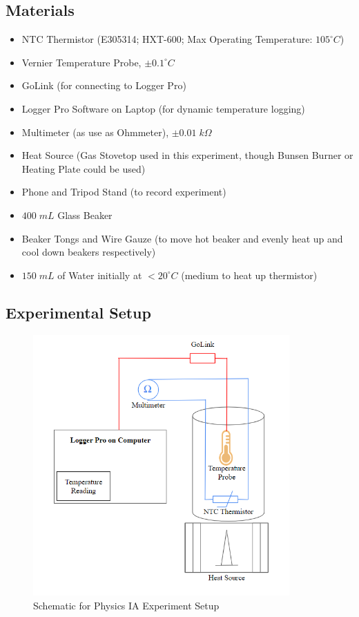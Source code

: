 \subsection{Materials}
\begin{itemize}[noitemsep]
    \item NTC Thermistor (E305314; HXT-600; Max Operating Temperature: $105^\circ C$)
    \item Vernier Temperature Probe, $\pm 0.1^\circ C$
    \item GoLink (for connecting to Logger Pro)
    \item Logger Pro Software on Laptop (for dynamic temperature logging)
    \item Multimeter (as use as Ohmmeter), $\pm 0.01 \; k\Omega$ 
    \item Heat Source (Gas Stovetop used in this experiment, though Bunsen Burner or Heating Plate could be used)
    \item Phone and Tripod Stand (to record experiment)
    \item $400 \; mL$ Glass Beaker
    \item Beaker Tongs and Wire Gauze (to move hot beaker and evenly heat up and cool down beakers respectively)
    \item $150 \; mL$ of Water initially at $<20^\circ C$ (medium to heat up thermistor)
\end{itemize}

\subsection{Experimental Setup}
\begin{figure}[ht]
    \centering
    \includegraphics[width=\textwidth,height=100mm,keepaspectratio]{images/IA_Schematic.png}
    \caption{Schematic for Physics IA Experiment Setup}
    \label{fig:schematic}
\end{figure}


